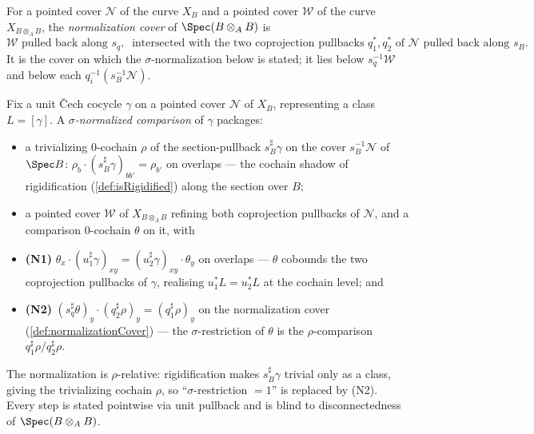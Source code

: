 \begin{definition}
  \label{def:normalizationCover}
  \leanok
  For a pointed cover \(\mathcal N\) of the curve \(X_B\) and a pointed cover \(\mathcal W\) of
  the curve \(X_{B \otimes_A B}\), the \emph{normalization cover} of \(\Spec(B \otimes_A B)\) is
  \[
    \mathcal W \text{ pulled back along } s_q, \ \text{ intersected with the two coprojection
    pullbacks } q_1^{*}, q_2^{*} \text{ of } \mathcal N \text{ pulled back along } s_B .
  \]
  It is the cover on which the \(\sigma\)-normalization below is stated; it lies below \(s_q^{-1}
  \mathcal W\) and below each \(q_i^{-1}(s_B^{-1}\mathcal N)\).
\end{definition}

\begin{definition}
  \label{def:normalizedCechComparison}
  \leanok
  Fix a unit \v Cech cocycle \(\gamma\) on a pointed cover \(\mathcal N\) of \(X_B\), representing
  a class \(L = [\gamma]\). A \emph{\(\sigma\)-normalized comparison} of \(\gamma\) packages:
  \begin{itemize}
    \item a trivializing \(0\)-cochain \(\rho\) of the section-pullback \(s_B^{\sharp}\gamma\) on
      the cover \(s_B^{-1}\mathcal N\) of \(\Spec B\): \(\rho_b \cdot (s_B^{\sharp}\gamma)_{b b'} =
      \rho_{b'}\) on overlaps — the cochain shadow of rigidification (\ref{def:isRigidified})
      along the section over \(B\);
    \item a pointed cover \(\mathcal W\) of \(X_{B \otimes_A B}\) refining both coprojection
      pullbacks of \(\mathcal N\), and a comparison \(0\)-cochain \(\theta\) on it, with
    \item \textbf{(N1)} \(\theta_x \cdot (u_1^{\sharp}\gamma)_{x y} = (u_2^{\sharp}\gamma)_{x y}
      \cdot \theta_y\) on overlaps — \(\theta\) cobounds the two coprojection pullbacks of
      \(\gamma\), realising \(u_1^{*} L = u_2^{*} L\) at the cochain level; and
    \item \textbf{(N2)} \((s_q^{\sharp}\theta)_y \cdot (q_2^{\sharp}\rho)_y = (q_1^{\sharp}\rho)_y\)
      on the normalization cover (\ref{def:normalizationCover}) — the \(\sigma\)-restriction of
      \(\theta\) is the \(\rho\)-comparison \(q_1^{\sharp}\rho / q_2^{\sharp}\rho\).
  \end{itemize}
  The normalization is \(\rho\)-relative: rigidification makes \(s_B^{\sharp}\gamma\) trivial only
  as a class, giving the trivializing cochain \(\rho\), so ``\(\sigma\)-restriction \(=1\)'' is
  replaced by (N2). Every step is stated pointwise via unit pullback and is blind to
  disconnectedness of \(\Spec(B \otimes_A B)\).
\end{definition}

